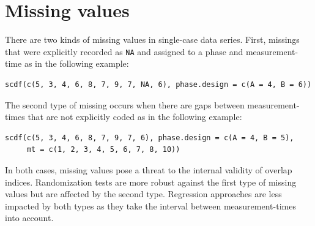 \documentclass[
]{book}
\begin{document}
\hypertarget{missing-values}{%
\section{Missing values}\label{missing-values}}

There are two kinds of missing values in single-case data series. First, missings that were explicitly recorded as \texttt{NA} and assigned to a phase and measurement-time as in the following example:

\begin{verbatim}
scdf(c(5, 3, 4, 6, 8, 7, 9, 7, NA, 6), phase.design = c(A = 4, B = 6))
\end{verbatim}

The second type of missing occurs when there are gaps between measurement-times that are not explicitly coded as in the following example:

\begin{verbatim}
scdf(c(5, 3, 4, 6, 8, 7, 9, 7, 6), phase.design = c(A = 4, B = 5), 
     mt = c(1, 2, 3, 4, 5, 6, 7, 8, 10))
\end{verbatim}

In both cases, missing values pose a threat to the internal validity of overlap indices. Randomization tests are more robust against the first type of missing values but are affected by the second type. Regression approaches are less impacted by both types as they take the interval between measurement-times into account.
\end{document}

